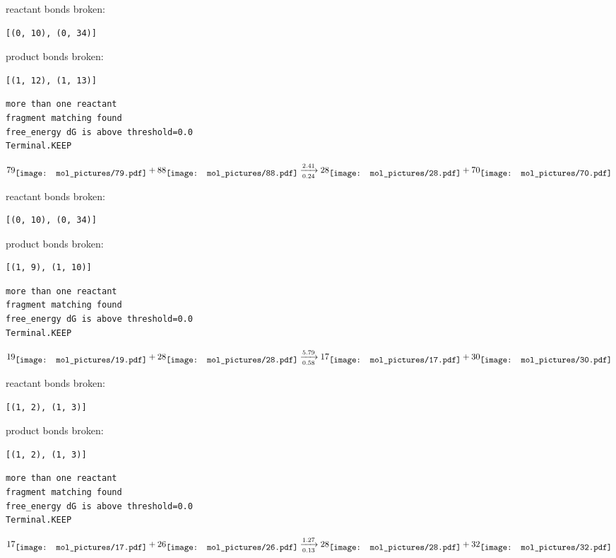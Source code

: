 \documentclass{article}
\begin{document}
reactant bonds broken:\begin{verbatim}
[(0, 10), (0, 34)]
\end{verbatim}
product bonds broken:\begin{verbatim}
[(1, 12), (1, 13)]
\end{verbatim}




\vspace{1cm}
\begin{verbatim}
more than one reactant
fragment matching found
free_energy dG is above threshold=0.0
Terminal.KEEP
\end{verbatim}
$$
79
\raisebox{-.5\height}{\texttt{[image: mol\_pictures/79.pdf]}}
+
88
\raisebox{-.5\height}{\texttt{[image: mol\_pictures/88.pdf]}}
\xrightarrow[0.24]{2.41}
28
\raisebox{-.5\height}{\texttt{[image: mol\_pictures/28.pdf]}}
+
70
\raisebox{-.5\height}{\texttt{[image: mol\_pictures/70.pdf]}}
$$


reactant bonds broken:\begin{verbatim}
[(0, 10), (0, 34)]
\end{verbatim}
product bonds broken:\begin{verbatim}
[(1, 9), (1, 10)]
\end{verbatim}




\vspace{1cm}
\begin{verbatim}
more than one reactant
fragment matching found
free_energy dG is above threshold=0.0
Terminal.KEEP
\end{verbatim}
$$
19
\raisebox{-.5\height}{\texttt{[image: mol\_pictures/19.pdf]}}
+
28
\raisebox{-.5\height}{\texttt{[image: mol\_pictures/28.pdf]}}
\xrightarrow[0.58]{5.79}
17
\raisebox{-.5\height}{\texttt{[image: mol\_pictures/17.pdf]}}
+
30
\raisebox{-.5\height}{\texttt{[image: mol\_pictures/30.pdf]}}
$$


reactant bonds broken:\begin{verbatim}
[(1, 2), (1, 3)]
\end{verbatim}
product bonds broken:\begin{verbatim}
[(1, 2), (1, 3)]
\end{verbatim}




\vspace{1cm}
\begin{verbatim}
more than one reactant
fragment matching found
free_energy dG is above threshold=0.0
Terminal.KEEP
\end{verbatim}
$$
17
\raisebox{-.5\height}{\texttt{[image: mol\_pictures/17.pdf]}}
+
26
\raisebox{-.5\height}{\texttt{[image: mol\_pictures/26.pdf]}}
\xrightarrow[0.13]{1.27}
28
\raisebox{-.5\height}{\texttt{[image: mol\_pictures/28.pdf]}}
+
32
\raisebox{-.5\height}{\texttt{[image: mol\_pictures/32.pdf]}}
$$
\end{document}

